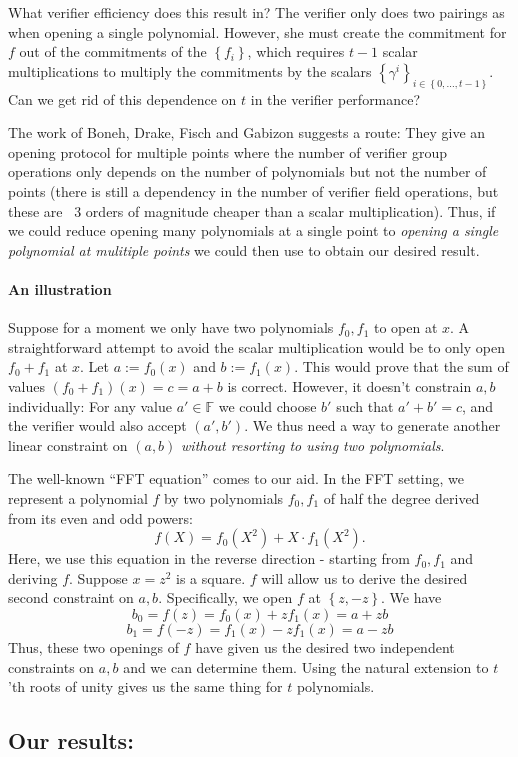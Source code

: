 \documentclass[11pt]{article} %
\newcommand{\F}{\ensuremath{\mathbb F}\xspace}
\newcommand{\defeq}{:=}
\newcommand{\setD}[1]{\ensuremath{\set{#1}_{i\in \set{0,\ldots,t-1}}}\xspace}
\newcommand{\set}[1]{\ensuremath{\left\{#1\right\}}\xspace}
\newcommand{\prg}[1]{ \paragraph{\textbf{#1}}}
\begin{document}
What verifier efficiency does this result in?
The verifier only does two pairings as when opening a single polynomial. However, she must create the commitment for $f$ out of the commitments of the \set{f_i}, which requires $t-1$ scalar multiplications to multiply the commitments by the scalars \setD{\gamma^i}.
Can we get rid of this dependence on $t$ in the verifier performance?

The work of Boneh, Drake, Fisch and Gabizon \cite{shplonk} suggests a route:
They give an opening protocol for multiple points where the number of verifier group operations only depends on the number of polynomials but not the number of points (there is still a dependency in the number of verifier field operations, but these are ~3 orders of magnitude cheaper than a scalar multiplication).
Thus, if we could reduce opening many polynomials at a single point to \textit{opening a single polynomial at mulitiple points} we could then use \cite{shplonk} to obtain our desired result.

\prg{An illustration}
Suppose for a moment we only have two polynomials $f_0,f_1$ to open at $x$.
A straightforward attempt to avoid the scalar multiplication would be to only open $f_0+f_1$ at $x$.
Let $a\defeq f_0(x)$ and $b\defeq f_1(x)$. This would prove that the sum of values $(f_0+f_1)(x) = c=a+b$ is correct.
However, it doesn't constrain $a,b$ individually: For  any value $a'\in \F$ we could choose $b'$ such that $a'+b'=c$,
and the verifier would also accept $(a',b')$. We thus need a way to generate another linear constraint on $(a,b)$ \textit{without resorting to using two polynomials}.

The well-known ``FFT equation'' comes to our aid.
In the FFT setting,  we represent a polynomial $f$  by two polynomials $f_0,f_1$ of half the degree derived from its even and odd powers:
\[f(X) = f_0(X^2)+X\cdot f_1(X^2).\]
Here, we use this equation in the reverse direction - starting from $f_0,f_1$ and deriving $f$.
Suppose $x=z^2$ is a square. $f$ will allow us to derive the desired second constraint on $a,b$. Specifically, we open $f$ at \set{z,-z}. We have
\[b_0=f(z)=f_0(x)+z f_1(x) = a+zb\]
\[b_1=f(-z)=f_1(x)-z f_1(x) = a-zb\]
Thus, these two openings of $f$ have given us the desired two independent constraints on $a,b$ and we can determine them.
Using the natural extension to $t$'th roots of unity gives us the same thing for $t$ polynomials.
\subsection{Our results:}
\end{document}
